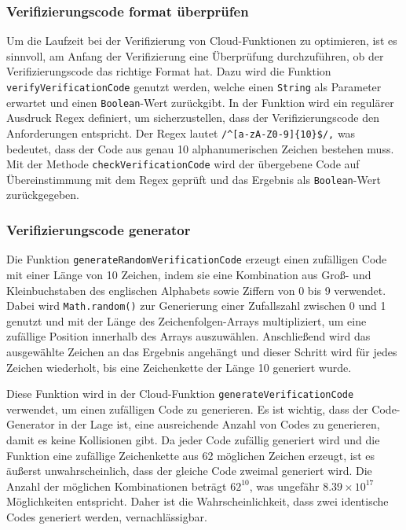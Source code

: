\subsubsection{Verifizierungscode format überprüfen}
Um die Laufzeit bei der Verifizierung von Cloud-Funktionen zu optimieren, ist es sinnvoll, am Anfang der Verifizierung eine Überprüfung durchzuführen, ob der Verifizierungscode das richtige Format hat. Dazu wird die Funktion \texttt{verifyVerificationCode} genutzt werden, welche einen \texttt{String} als Parameter erwartet und einen \texttt{Boolean}-Wert zurückgibt. In der Funktion wird ein regulärer Ausdruck Regex definiert, um sicherzustellen, dass der Verifizierungscode den Anforderungen entspricht. Der Regex lautet \texttt{/}\verb|^[a-zA-Z0-9]{10}$/|\texttt{,} was bedeutet, dass der Code aus genau 10 alphanumerischen Zeichen bestehen muss. Mit der Methode \texttt{checkVerificationCode} wird der übergebene Code auf Übereinstimmung mit dem Regex geprüft und das Ergebnis als \texttt{Boolean}-Wert zurückgegeben.

\subsubsection{Verifizierungscode generator}

Die Funktion \texttt{generateRandomVerificationCode} erzeugt einen zufälligen Code mit einer Länge von 10 Zeichen, indem sie eine Kombination aus Groß- und Kleinbuchstaben des englischen Alphabets sowie Ziffern von 0 bis 9 verwendet. Dabei wird \texttt{Math.random()} zur Generierung einer Zufallszahl zwischen 0 und 1 genutzt und mit der Länge des Zeichenfolgen-Arrays multipliziert, um eine zufällige Position innerhalb des Arrays auszuwählen. Anschließend wird das ausgewählte Zeichen an das Ergebnis angehängt und dieser Schritt wird für jedes Zeichen wiederholt, bis eine Zeichenkette der Länge 10 generiert wurde.

Diese Funktion wird in der Cloud-Funktion \texttt{generateVerificationCode} verwendet, um einen zufälligen Code zu generieren. Es ist wichtig, dass der Code-Generator in der Lage ist, eine ausreichende Anzahl von Codes zu generieren, damit es keine Kollisionen gibt. Da jeder Code zufällig generiert wird und die Funktion eine zufällige Zeichenkette aus 62 möglichen Zeichen erzeugt, ist es äußerst unwahrscheinlich, dass der gleiche Code zweimal generiert wird. Die Anzahl der möglichen Kombinationen beträgt $62^{10}$, was ungefähr $8.39 \times 10^{17}$ Möglichkeiten entspricht. Daher ist die Wahrscheinlichkeit, dass zwei identische Codes generiert werden, vernachlässigbar.

